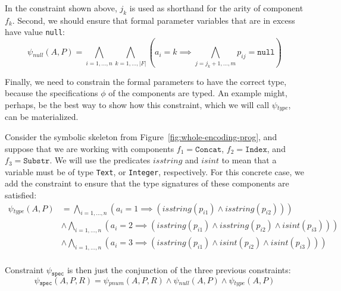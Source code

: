 \noindent
In the constraint shown above, $j_k$ is used as shorthand for the arity of
component $f_k$.
Second, we should ensure that formal parameter variables that are in excess
have value \lstinline{null}:
%
\[
  \psi{}_{null}(A, P) =
  \bigwedge_{i=1,\ldots,n} \bigwedge_{k=1,\ldots,|F|}
  (a_i = k \implies \bigwedge_{j=j_k+1,\ldots,m} p_{ij} = \mathtt{null})
\]

\noindent
Finally, we need to constrain the formal parameters to have the correct type,
because the specifications $\phi{}$ of the components are typed.
An example might, perhaps, be the best way to show how this constraint, which we
will call $\psi{}_{type}$, can be materialized.

\begin{example}
  Consider the symbolic skeleton from Figure~\ref{fig:whole-encoding-prog}, and
  suppose that we are working with components
  $f_1 = \mathtt{Concat}$, $f_2 = \mathtt{Index}$, and $f_3 = \mathtt{Substr}$.
  We will use the predicates $isstring$ and $isint$ to mean that a variable must
  be of type \lstinline{Text}, or \lstinline{Integer}, respectively.
  For this concrete case, we add the constraint to ensure that the type
  signatures of these components are satisfied:
  \begin{align*}
    \psi{}_{type}(A, P)
    &= \bigwedge_{i=1,\ldots,n}
      (a_i = 1 \implies (isstring(p_{i1}) \wedge isstring(p_{i2}))) \\
    &\wedge \bigwedge_{i=1,\ldots,n}
      (a_i = 2 \implies (isstring(p_{i1}) \wedge isstring(p_{i2}) \wedge isint(p_{i3}))) \\
    &\wedge \bigwedge_{i=1,\ldots,n}
      (a_i = 3 \implies (isstring(p_{i1}) \wedge isint(p_{i2}) \wedge isint(p_{i3}))) \\
  \end{align*}
\end{example}

\noindent
Constraint $\psi{}_{\mathtt{spec}}$ is then just the conjunction of the three
previous constraints:
%
\[
  \psi{}_{\mathtt{spec}}(A, P, R) =
  \psi{}_{pnum}(A, P, R) \wedge \psi{}_{null}(A, P) \wedge \psi{}_{type}(A, P)
\]

